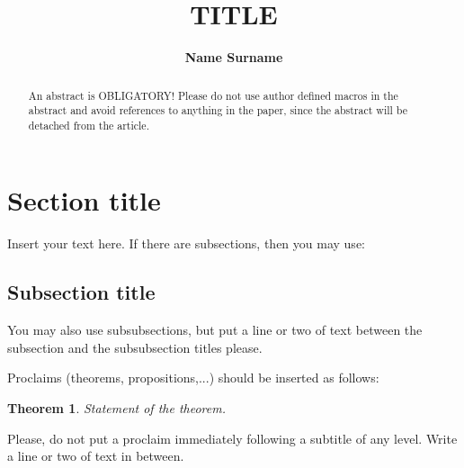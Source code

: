 \documentclass[a4paper,draft]{amsproc}
\title[Running title (header)]{TITLE}
\author[Surname]{\bfseries Name Surname}
\theoremstyle{plain}
\newtheorem{thm}{Theorem}[section]
\theoremstyle{definition}
\theoremstyle{remark}
\numberwithin{equation}{section}
\begin{document}
\vspace{18mm} \setcounter{page}{1} \thispagestyle{empty}


\begin{abstract}
An abstract is OBLIGATORY!
Please do not use author defined macros in the abstract
and avoid references to anything in the paper,
since the abstract will be detached from the article.
\end{abstract}

\maketitle

\section{Section title}  %

Insert your text here. If there are subsections, then you may use:

\subsection{Subsection title}
You may also use subsubsections,
but put a line or two of text between the subsection
and the subsubsection titles please.

Proclaims (theorems, propositions,...) should be
inserted as follows:

\begin{thm} \label{some label} %
Statement of the theorem.
\end{thm}

Please, do not put a proclaim immediately following a subtitle of any level.
Write a line or two of text in between.
\end{document}
